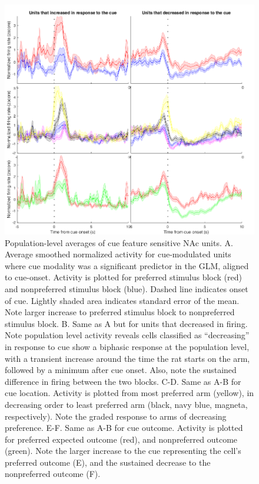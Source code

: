 \documentclass[11pt]{article}
\begin{document}
\begin{figure}[h]
\centering
\includegraphics[width=\textwidth]{Fig 7 - Population averages.png}
\caption{Population-level averages of cue feature sensitive NAc units. A. Average smoothed normalized activity for cue-modulated units where cue modality was a significant predictor in the GLM, aligned to cue-onset. Activity is plotted for preferred stimulus block (red) and nonpreferred stimulus block (blue). Dashed line indicates onset of cue. Lightly shaded area indicates standard error of the mean. Note larger increase to preferred stimulus block to nonpreferred stimulus block. B. Same as A but for units that decreased in firing. Note population level activity reveals cells classified as “decreasing” in response to cue show a biphasic response at the population level, with a transient increase around the time the rat starts on the arm, followed by a minimum after cue onset. Also, note the sustained difference in firing between the two blocks. C-D. Same as A-B for cue location. Activity is plotted from most preferred arm (yellow), in decreasing order to least preferred arm (black, navy blue, magneta, respectively). Note the graded response to arms of decreasing preference. E-F. Same as A-B for cue outcome. Activity is plotted for preferred expected outcome (red), and nonpreferred outcome (green). Note the larger increase to the cue representing the cell’s preferred outcome (E), and the sustained decrease to the nonpreferred outcome (F).}
\label{fig:pop}
\end{figure}
\end{document}
